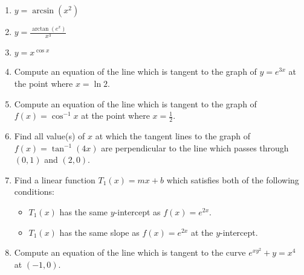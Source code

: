\documentclass[12pt]{article}
\newif\ifans
\begin{document}
\begin{enumerate}
\ifans{\fbox{$-\frac{3}{\sqrt{1-{9x}^2}}$}} \fi

\item $y = \arcsin{(x^2)}$ 

\ifans{\fbox{$\frac{2x}{\sqrt{1-x^4}}$}} \fi

\item $y = \frac{\arctan{(e^x)}}{x^3}$ 

\ifans{\fbox{$\frac{xe^{x}-3\tan^{-1}{(e^x)}-3e^{2x}\tan^{-1}{(e^x)}}{x^4(1+e^{2x})}$}} \fi

\item $y=x^{\cos{x}}$

\ifans{\fbox{$x^{\cos{x}}\left(\frac{\cos{x}}{x}-\sin{x}\ln{x}\right)$}} \fi

\item Compute an equation of the line which is tangent to the graph of $y=e^{3x}$ at the point where $x=\ln2$.

\ifans{\fbox{$y-8=24(x-\ln{2})$}} \fi

\item Compute an equation of the line which is tangent to the graph of $f(x)=\cos^{-1}{x}$ at the point where $x=\frac{1}{2}$.

\ifans{\fbox{$y=-\frac{2}{\sqrt{3}}x+\frac{\pi+\sqrt{3}}{3}$}} \fi

\item Find all value(s) of $x$ at which the tangent lines to the graph of $f(x)=\tan^{-1}{(4x)}$ are perpendicular to the line which passes through $(0,1)$ and $(2,0)$.

\ifans{\fbox{$x=\pm\frac{1}{4}$}} \fi

\item Find a linear function $T_1(x)=mx+b$ which satisfies both of the following conditions:

\begin{itemize}

\item $T_1(x)$ has the same $y$-intercept as $f(x)=e^{2x}$.

\item $T_1(x)$ has the same slope as $f(x)=e^{2x}$ at the $y$-intercept.

\end{itemize}

\ifans{\fbox{$y=2x+1$}} \fi

\item Compute an equation of the line which is tangent to the curve $e^{xy^2}+y=x^4$ at $(-1,0)$.

\ifans{\fbox{$y=-4x-4$}} \fi


\end{enumerate}
\end{document}

